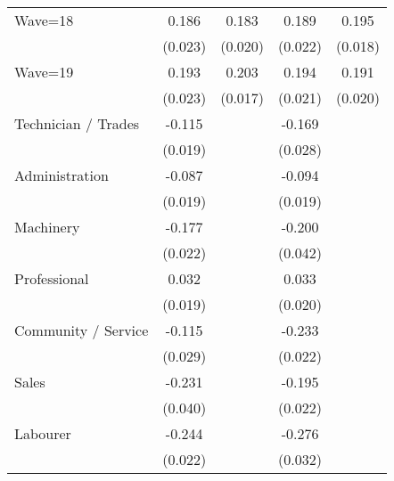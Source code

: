 {\begin{tabular}{l*{4}{c}}
Wave=18             &       0.186\sym{***}&       0.183\sym{***}&       0.189\sym{***}&       0.195\sym{***}\\
                    &     (0.023)         &     (0.020)         &     (0.022)         &     (0.018)         \\
Wave=19             &       0.193\sym{***}&       0.203\sym{***}&       0.194\sym{***}&       0.191\sym{***}\\
                    &     (0.023)         &     (0.017)         &     (0.021)         &     (0.020)         \\
Technician / Trades &      -0.115\sym{***}&                     &      -0.169\sym{***}&                     \\
                    &     (0.019)         &                     &     (0.028)         &                     \\
Administration      &      -0.087\sym{***}&                     &      -0.094\sym{***}&                     \\
                    &     (0.019)         &                     &     (0.019)         &                     \\
Machinery           &      -0.177\sym{***}&                     &      -0.200\sym{***}&                     \\
                    &     (0.022)         &                     &     (0.042)         &                     \\
Professional        &       0.032\sym{*}  &                     &       0.033         &                     \\
                    &     (0.019)         &                     &     (0.020)         &                     \\
Community / Service &      -0.115\sym{***}&                     &      -0.233\sym{***}&                     \\
                    &     (0.029)         &                     &     (0.022)         &                     \\
Sales               &      -0.231\sym{***}&                     &      -0.195\sym{***}&                     \\
                    &     (0.040)         &                     &     (0.022)         &                     \\
Labourer            &      -0.244\sym{***}&                     &      -0.276\sym{***}&                     \\
                    &     (0.022)         &                     &     (0.032)         &                     \\

\end{tabular}}
